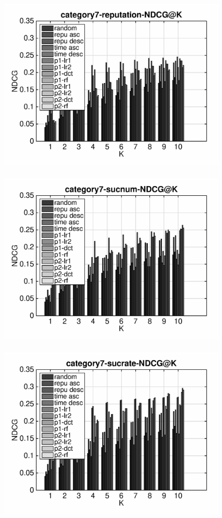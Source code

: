 \documentclass{article}
\begin{document}
\begin{figure}[ht]
\begin{flushleft}
\includegraphics[width=18cm,height=9cm]{category7-reputation-NDCG@K.eps}
\includegraphics[width=18cm,height=9cm]{category7-sucnum-NDCG@K.eps}
\includegraphics[width=18cm,height=9cm]{category7-sucrate-NDCG@K.eps}
\end{flushleft}
\end{figure}
\end{document}
